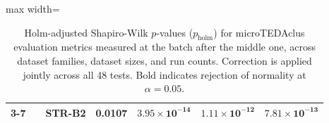 \begin{table}
\begin{adjustbox}{max width=\textwidth}
\begin{tabular}{|c|c|c|cccc|}
        \cline{3-7}
         &  & STR-B2 & \textbf{0.0107} & $\boldsymbol{3.95 \times 10^{-14}}$ & $\boldsymbol{1.11 \times 10^{-12}}$ & $\boldsymbol{7.81 \times 10^{-13}}$ \\
        \hline
    \end{tabular}
    \end{adjustbox}
    \caption{Holm-adjusted Shapiro-Wilk $p$-values ($p_{\mathrm{holm}}$) for microTEDAclus evaluation metrics measured at the batch after the middle one, across dataset families, dataset sizes, and run counts. Correction is applied jointly across all 48 tests. Bold indicates rejection of normality at $\alpha=0.05$.}
    \label{tab:normality_shapiro}
\end{table}
